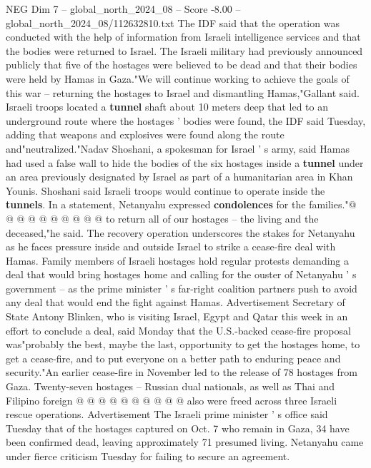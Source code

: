 \begin{textsample}{NEG Dim 7 – global\_north\_2024\_08 – Score -8.00 – global\_north\_2024\_08/112632810.txt}  \label{ex:f7_neg_087}
The IDF said that the operation was conducted with the help of information from Israeli intelligence services and that the bodies were returned to Israel.
The Israeli military had previously announced publicly that five of the hostages were believed to be dead and that their bodies were held by Hamas in Gaza."We will continue working to achieve the goals of this war -- returning the hostages to Israel and dismantling Hamas,"Gallant said.
Israeli troops located a \textbf{tunnel} shaft about 10 meters deep that led to an underground route where the hostages ' bodies were found, the IDF said Tuesday, adding that weapons and explosives were found along the route and"neutralized."Nadav Shoshani, a spokesman for Israel ' s army, said Hamas had used a false wall to hide the bodies of the six hostages inside a \textbf{tunnel} under an area previously designated by Israel as part of a humanitarian area in Khan Younis.
Shoshani said Israeli troops would continue to operate inside the \textbf{tunnels}.
In a statement, Netanyahu expressed \textbf{condolences} for the families."@ @ @ @ @ @ @ @ @ @ to return all of our hostages -- the living and the deceased,"he said.
The recovery operation underscores the stakes for Netanyahu as he faces pressure inside and outside Israel to strike a cease-fire deal with Hamas.
Family members of Israeli hostages hold regular protests demanding a deal that would bring hostages home and calling for the ouster of Netanyahu ' s government -- as the prime minister ' s far-right coalition partners push to avoid any deal that would end the fight against Hamas.
Advertisement Secretary of State Antony Blinken, who is visiting Israel, Egypt and Qatar this week in an effort to conclude a deal, said Monday that the U.S.-backed cease-fire proposal was"probably the best, maybe the last, opportunity to get the hostages home, to get a cease-fire, and to put everyone on a better path to enduring peace and security."An earlier cease-fire in November led to the release of 78 hostages from Gaza.
Twenty-seven hostages -- Russian dual nationals, as well as Thai and Filipino foreign @ @ @ @ @ @ @ @ @ @ also were freed across three Israeli rescue operations.
Advertisement The Israeli prime minister ' s office said Tuesday that of the hostages captured on Oct. 7 who remain in Gaza, 34 have been confirmed dead, leaving approximately 71 presumed living.
Netanyahu came under fierce criticism Tuesday for failing to secure an agreement.

\end{textsample}
